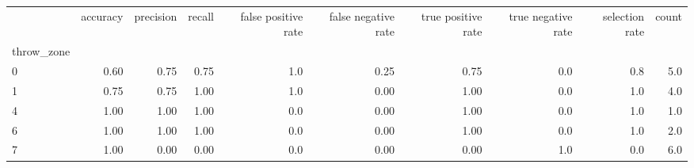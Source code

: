 \begin{tabular}{lrrrrrrrrr}
\toprule
{} &  accuracy &  precision &  recall &  false positive rate &  false negative rate &  true positive rate &  true negative rate &  selection rate &  count \\
throw\_zone &           &            &         &                      &                      &                     &                     &                 &        \\
\midrule
0          &      0.60 &       0.75 &    0.75 &                  1.0 &                 0.25 &                0.75 &                 0.0 &             0.8 &    5.0 \\
1          &      0.75 &       0.75 &    1.00 &                  1.0 &                 0.00 &                1.00 &                 0.0 &             1.0 &    4.0 \\
4          &      1.00 &       1.00 &    1.00 &                  0.0 &                 0.00 &                1.00 &                 0.0 &             1.0 &    1.0 \\
6          &      1.00 &       1.00 &    1.00 &                  0.0 &                 0.00 &                1.00 &                 0.0 &             1.0 &    2.0 \\
7          &      1.00 &       0.00 &    0.00 &                  0.0 &                 0.00 &                0.00 &                 1.0 &             0.0 &    6.0 \\
\bottomrule
\end{tabular}
